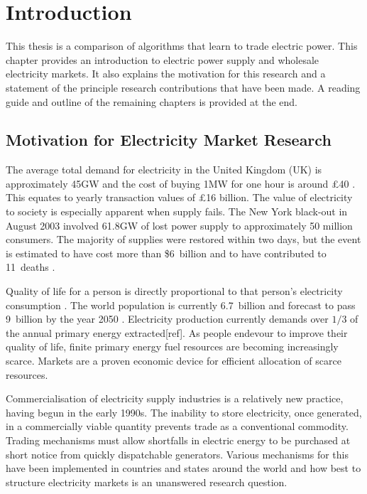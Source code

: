 \chapter{Introduction}
This thesis is a comparison of algorithms that learn to trade electric power.
This chapter provides an introduction to electric power supply and
wholesale electricity markets.  It also explains the motivation for this
research and a statement of the principle research contributions that
have been made.  A reading guide and outline of the remaining chapters is
provided at the end.

\section{Motivation for Electricity Market Research}
The average total demand for electricity in the United Kingdom (UK) is
approximately 45GW and the cost of buying 1MW for one hour is around \pounds40 \cite{decc:dukes09}.
This equates to yearly transaction values of \pounds16 billion.  The value of
electricity to society is especially apparent when supply fails.
The New York black-out in August 2003 involved 61.8GW of lost power supply to
approximately 50 million consumers. The majority of supplies were restored within two days, but the event is estimated to have cost more than \$6~billion and to have
contributed to 11~deaths \cite{minkel:2008,icf:2003}.

Quality of life for a person is directly proportional to that person's
electricity consumption \cite{alam:qol}.  The world population is currently
6.7~billion and forecast to pass 9~billion by the year 2050 \cite{un:pop}.
Electricity production currently demands over $1/3$ of the annual primary
energy extracted[ref]. As people endevour to improve their quality of life,
finite primary energy fuel resources are becoming increasingly scarce. Markets
are a proven economic device for efficient allocation of scarce resources.

Commercialisation of electricity supply industries is a relatively new
practice, having begun in the early 1990s.  The inability to store electricity,
once generated, in a commercially viable quantity prevents trade as a
conventional commodity.  Trading mechanisms must allow
shortfalls in electric energy to be purchased at short notice from quickly dispatchable
generators.  Various mechanisms for this have been implemented in countries and
states around the world and how best to structure electricity markets is an
unanswered research question.

